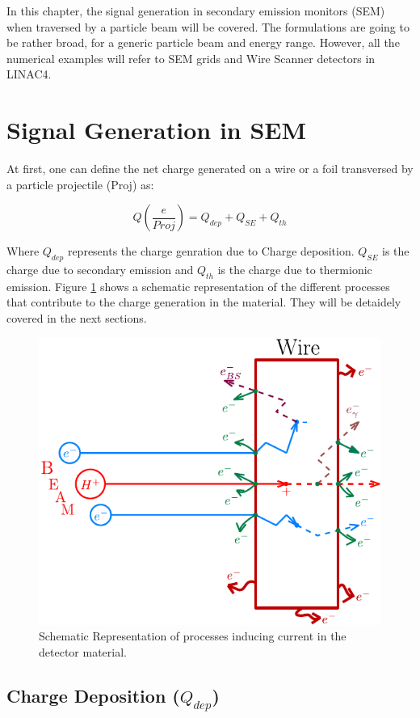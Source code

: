 \pagestyle{fancy}

\graphicspath{ {Figures/Chapter4_IntensitySimulation/} }

In this chapter, the signal generation in secondary emission monitors (SEM) when traversed by a particle beam will be covered. The formulations are going to be rather broad, for a generic particle beam and energy range. However, all the numerical examples will refer to SEM grids and Wire Scanner detectors in LINAC4. 

\section{Signal Generation in SEM}

At first, one can define the net charge generated on a wire or a foil transversed by a particle projectile (Proj) as: 

\begin{equation}
    \label{eq:Qsum}
    Q\left(\frac{e}{Proj}\right) = Q_{dep} + Q_{SE} + Q_{th}
\end{equation}

Where $Q_{dep}$ represents the charge genration due to Charge deposition. $Q_{SE}$ is the charge due to secondary emission and $Q_{th}$ is the charge due to thermionic emission. Figure \ref{fig:SignalGeneration} shows a schematic representation of the different processes that contribute to the charge generation in the material. They will be detaidely covered in the next sections. 

\begin{figure}[h]
    \centering
    \includegraphics[width=0.50\columnwidth]{Figure_ChargeGeneration/ChargeGen.pdf}
    \caption{Schematic Representation of processes inducing current in the detector material.}
    \label{fig:SignalGeneration}
\end{figure}

\subsection{Charge Deposition ($Q_{dep}$)}

